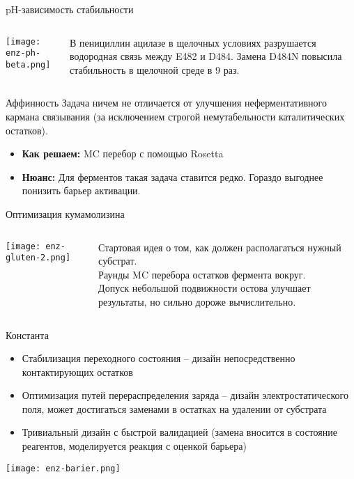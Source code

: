 \begin{frame}{pH-зависимость стабильности}
\begin{columns}
\begin{column}{0.7\textwidth}
    \texttt{[image: enz-ph-beta.png]}
\end{column}
\begin{column}{0.3\textwidth}
    В пенициллин ацилазе в щелочных условиях разрушается водородная связь между E482 и D484. Замена D484N повысила стабильность в щелочной среде в 9 раз.
\end{column}
\end{columns}
\end{frame}


\begin{frame}{Аффинность}
    Задача ничем не отличается от улучшения неферментативного кармана связывания (за исключением строгой немутабельности каталитических остатков).
\begin{itemize}
    \item \textbf{Как решаем:} MC перебор с помощью Rosetta
    \item \textbf{Нюанс:} Для ферментов такая задача ставится редко. Гораздо выгоднее понизить барьер активации.
\end{itemize}
\end{frame}



\begin{frame}{Оптимизация кумамолизина }
\begin{columns}
\begin{column}{0.5\textwidth}
    \texttt{[image: enz-gluten-2.png]}
\end{column}
\begin{column}{0.5\textwidth}
    Стартовая идея о том, как должен располагаться нужный субстрат. \\
Раунды MC перебора остатков фермента вокруг. \\
Допуск небольшой подвижности остова улучшает результаты, но сильно дороже вычислительно.
\end{column}
\end{columns}
\end{frame}


\begin{frame}{Константа}
    \begin{itemize}
        \item Стабилизация переходного состояния – дизайн непосредственно контактирующих остатков 
        \item Оптимизация путей перераспределения заряда – дизайн электростатического поля, может достигаться заменами в остатках на удалении от субстрата
        \item Тривиальный дизайн с быстрой валидацией (замена вносится в состояние реагентов, моделируется реакция с оценкой барьера)
    \end{itemize}
    \texttt{[image: enz-barier.png]}
\end{frame}

